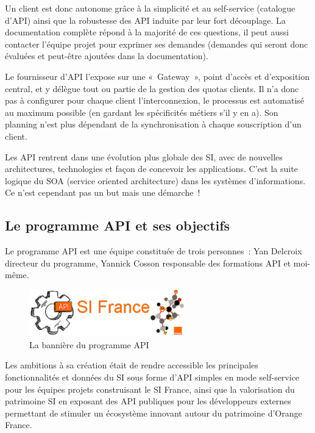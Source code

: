     Un client est donc autonome grâce à la simplicité et au self-service (catalogue d’API) ainsi que la robustesse des API induite par leur fort découplage.
    La documentation complète répond à la majorité de ces questions, il peut aussi contacter l’équipe projet pour exprimer ses demandes (demandes qui seront donc évaluées et peut-être ajoutées dans la documentation).

    Le fournisseur d’API l’expose sur une « Gateway », point d’accès et d’exposition central, et y délègue tout ou partie de la gestion des quotas clients.
    Il n’a donc pas à configurer pour chaque client l’interconnexion, le processus est automatisé au maximum possible (en gardant les spécificités métiers s’il y en a).
    Son planning n’est plus dépendant de la synchronisation à chaque souscription d’un client.

    Les API rentrent dans une évolution plus globale des SI, avec de nouvelles architectures, technologies et façon de concevoir les applications.
    C’est la suite logique du SOA (service oriented architecture) dans les systèmes d'informations.
    Ce n’est cependant pas un but mais une démarche !

    \subsection{Le programme API et ses objectifs}

    Le programme API est une équipe constituée de trois personnes :  Yan Delcroix directeur du programme, Yannick Cosson responsable des formations API et moi-même.

    \begin{figure}[!ht]
        \center
        \includegraphics[width=0.6\textwidth]{./images/api-si-france.jpg}
        \caption{La bannière du programme API}
    \end{figure}

    Les ambitions à sa création était de rendre accessible les principales fonctionnalités et données du SI sous forme d’API simples en mode self-service pour les équipes projets construisant le SI France, ainsi que la valorisation du patrimoine SI en exposant des API publiques pour les développeurs externes permettant de stimuler un écosystème innovant autour du patrimoine d’Orange France.

